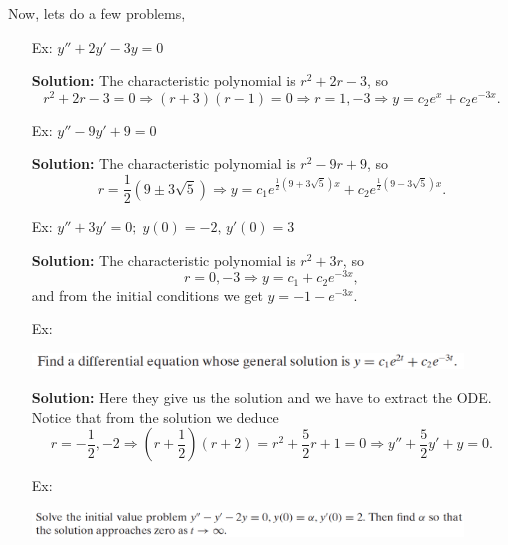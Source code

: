 \documentclass[reqno]{amsart}
\theoremstyle{definition}
\begin{document}
\pagebreak

Now, lets do a few problems,

\begin{enumerate}

\item[Ex:  ]  $y'' + 2y' - 3y = 0$

\textbf{Solution:  }
  The characteristic polynomial is $r^2 + 2r - 3$, so
%
\begin{equation*}
r^2 + 2r - 3 = 0 \Rightarrow (r+3)(r-1) = 0 \Rightarrow r = 1, -3 \Rightarrow y = c_2e^x + c_2e^{-3x}.
\end{equation*}
%

\item[Ex:  ]  $y'' - 9y' + 9 = 0$

\textbf{Solution:  }
The characteristic polynomial is $r^2 - 9r + 9$, so
%
\begin{equation*}
r = \frac{1}{2}(9 \pm 3\sqrt{5}) \Rightarrow y = c_1e^{\frac{1}{2}(9 + 3\sqrt{5})x} +  c_2e^{\frac{1}{2}(9 - 3\sqrt{5})x}.
\end{equation*}
%

\item[Ex:  ] $y'' + 3y' = 0;\; y(0) = -2,\, y'(0) = 3$

\textbf{Solution:  }
 The characteristic polynomial is $r^2 + 3r$, so
%
\begin{equation*}
r = 0, -3 \Rightarrow y = c_1 + c_2e^{-3x},
\end{equation*}
%
and from the initial conditions we get $y = -1-e^{-3x}$.

\item[Ex:  ]  

\includegraphics[width = 0.9\textwidth]{BoyceDiPrima_pg144_Ex18}

\textbf{Solution:  }
Here they give us the solution and we have to extract the ODE.
Notice that from the solution we deduce 
%
\begin{equation*}
r = -\frac{1}{2}, -2 \Rightarrow (r+\frac{1}{2})(r+2) = r^2 + \frac{5}{2}r+1 = 0
\Rightarrow y'' + \frac{5}{2}y' + y = 0.
\end{equation*}
%

\item[Ex:  ]  

\includegraphics[width = 0.9\textwidth]{BoyceDiPrima_pg144_Ex21}


\end{enumerate}
\end{document}
